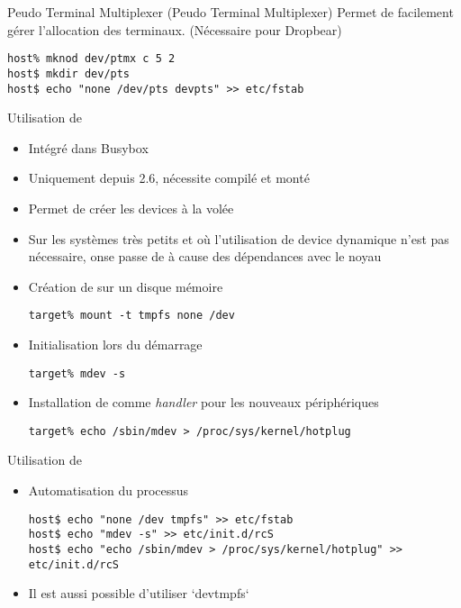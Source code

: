 \begin{frame}[fragile=singleslide]{Peudo Terminal Multiplexer}
   (Peudo  Terminal Multiplexer) Permet  de facilement gérer
  l'allocation des terminaux. (Nécessaire pour Dropbear)
  \begin{lstlisting}
host% mknod dev/ptmx c 5 2
host$ mkdir dev/pts
host$ echo "none /dev/pts devpts" >> etc/fstab
  \end{lstlisting}
\end{frame}

\begin{frame}[fragile=singleslide]{Utilisation de }
  \begin{itemize}
  \item Intégré dans Busybox
  \item Uniquement depuis 2.6, nécessite  compilé et monté
  \item Permet de créer les devices à la volée
  \item Sur  les systèmes  très petits et  où l'utilisation  de device
    dynamique n'est  pas nécessaire, onse passe de   à cause
    des dépendances avec le noyau
  \item Création de  sur un disque mémoire
    \begin{lstlisting}
target% mount -t tmpfs none /dev
    \end{lstlisting}
  \item Initialisation  lors du démarrage
    \begin{lstlisting}
target% mdev -s
    \end{lstlisting}
  \item  Installation  de    comme \emph{handler}  pour  les
    nouveaux périphériques
    \begin{lstlisting}
target% echo /sbin/mdev > /proc/sys/kernel/hotplug
    \end{lstlisting}
  \end{itemize}
\end{frame}

\begin{frame}[fragile=singleslide]{Utilisation de }
  \begin{itemize}
  \item  Automatisation du processus
    \begin{lstlisting}
host$ echo "none /dev tmpfs" >> etc/fstab
host$ echo "mdev -s" >> etc/init.d/rcS
host$ echo "echo /sbin/mdev > /proc/sys/kernel/hotplug" >> etc/init.d/rcS
    \end{lstlisting}
  \item Il est aussi possible d'utiliser `devtmpfs`
  \end{itemize}
\end{frame}

